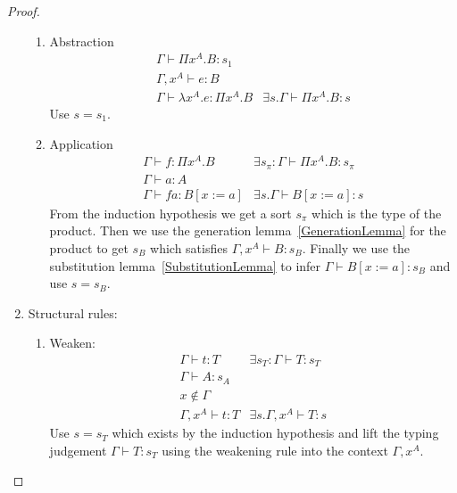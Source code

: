 \begin{theorem}
\begin{proof}
\begin{enumerate}
\begin{enumerate}
                \item Abstraction
                $$
                \begin{array}{l|l}
                    \Gamma \vdash \Pi x^A. B : s_1
                    \\
                    \Gamma,x^A \vdash e: B
                    \\
                    \hline
                    \Gamma \vdash \lambda x^A. e : \Pi x^A. B
                    &
                    \exists s. \Gamma \vdash \Pi x^A. B: s
                \end{array}
                $$
                Use $s = s_1$.

                \item Application
                $$
                \begin{array}{l|l}
                    \Gamma \vdash f: \Pi x^A. B
                    &
                    \exists s_\pi: \Gamma \vdash \Pi x^A. B: s_\pi
                    \\
                    \Gamma \vdash a: A
                    \\
                    \hline
                    \Gamma \vdash f a: B[x:=a]
                    &
                    \exists s. \Gamma \vdash B[x:=a]: s
                \end{array}
                $$
                From the induction hypothesis we get a sort $s_\pi$ which is the
                type of the product. Then we use the generation
                lemma~\ref{GenerationLemma} for the product to get $s_B$ which
                satisfies $\Gamma, x^A \vdash B: s_B$. Finally we use the
                substitution lemma~\ref{SubstitutionLemma} to infer $\Gamma
                \vdash B[x:=a] : s_B$ and use $s = s_B$.
            \end{enumerate}

            \item Structural rules:
            \begin{enumerate}
                \item Weaken:
                $$
                \begin{array}{l|l}
                    \Gamma \vdash t: T
                    &
                    \exists s_T: \Gamma \vdash T: s_T
                    \\
                    \Gamma \vdash A: s_A
                    \\
                    x \notin \Gamma
                    \\
                    \hline
                    \Gamma, x^A \vdash t: T
                    &
                    \exists s. \Gamma, x^A \vdash T: s
                \end{array}
                $$
                Use $s = s_T$ which exists by the induction hypothesis and lift
                    the typing judgement $\Gamma \vdash T : s_T$ using the
                    weakening rule into the context $\Gamma, x^A$.


\end{enumerate}
\end{enumerate}
\end{proof}
\end{theorem}
